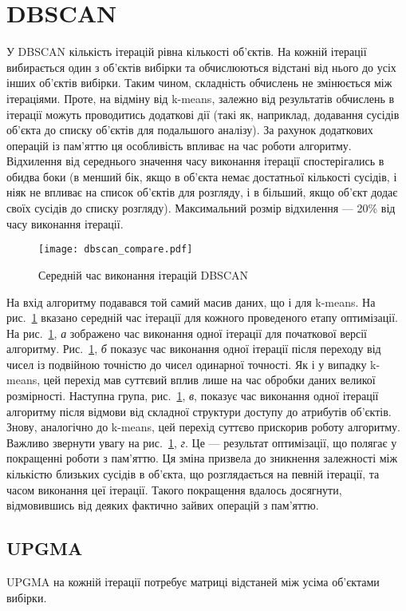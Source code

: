             \section{DBSCAN}
                У DBSCAN кількість ітерацій рівна кількості об’єктів. На кожній ітерації вибирається один з об’єктів вибірки та обчислюються відстані від нього до усіх інших об’єктів вибірки. Таким чином, складність обчислень не змінюється між ітераціями. Проте, на відміну від k-means, залежно від результатів обчислень в ітерації можуть проводитись додаткові дії (такі як, наприклад, додавання сусідів об’єкта до списку об’єктів для подальшого аналізу). За рахунок додаткових операцій із пам’яттю ця особливість впливає на час роботи алгоритму. Відхилення від середнього значення часу виконання ітерації спостерігались в обидва боки (в менший бік, якщо в об’єкта немає достатньої кількості сусідів, і ніяк не впливає на список об’єктів для розгляду, і в більший, якщо об’єкт додає своїх сусідів до списку розгляду). Максимальний розмір відхилення --- 20\% від часу виконання ітерації.
                
                \begin{figure}
                    \centering
                    \texttt{[image: dbscan\_compare.pdf]}
                    \caption{Середній час виконання ітерацій DBSCAN}\label{fig:dbscan_compare}
                \end{figure}
                
                На вхід алгоритму подавався той самий масив даних, що і для k-means. На рис.~\ref{fig:dbscan_compare} вказано середній час ітерації для кожного проведеного етапу оптимізації. На рис.~\ref{fig:dbscan_compare}, \emph{а} зображено час виконання одної ітерації для початкової версії алгоритму. Рис.~\ref{fig:dbscan_compare}, \emph{б} показує час виконання одної ітерації після переходу від чисел із подвійною точністю до чисел одинарної точності. Як і у випадку k-means, цей перехід мав суттєвий вплив лише на час обробки даних великої розмірності. Наступна група, рис.~\ref{fig:dbscan_compare}, \emph{в}, показує час виконання одної ітерації алгоритму після відмови від складної структури доступу до атрибутів об’єктів. Знову, аналогічно до k-means, цей перехід суттєво прискорив роботу алгоритму. Важливо звернути увагу на рис.~\ref{fig:dbscan_compare}, \emph{г}. Це --- результат оптимізації, що полягає у покращенні роботи з пам’яттю. Ця зміна призвела до зникнення залежності між кількістю близьких сусідів в об’єкта, що розглядається на певній ітерації, та часом виконання цеї ітерації. Такого покращення вдалось досягнути, відмовившись від деяких фактично зайвих операцій з пам’яттю.
                
            \subsection{UPGMA}
                UPGMA на кожній ітерації потребує матриці відстаней між усіма об’єктами вибірки. 
